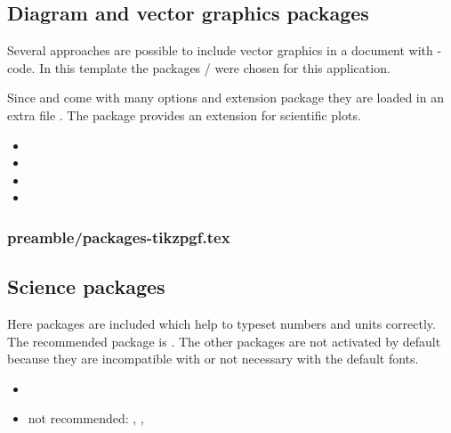 

\subsection{Diagram and vector graphics packages}
Several approaches are possible to include vector graphics in a \latex document with \latex-code. In this template the packages / were chosen for this application.

Since  and  come with many options and 
extension package they are loaded in an extra file 
. The package  
provides an extension for scientific plots.

\begin{itemize}[noitemsep]
\item {}
\item {}
\item {}
\item {}
\end{itemize}


\subsubsection{preamble/packages-tikzpgf.tex}


\subsection{Science packages}
Here packages are included which help to typeset numbers and units correctly.
The recommended package is . The other packages are not activated by default because they are incompatible with  or not necessary with the default fonts.

\begin{itemize}[noitemsep]
\item {}
\item not recommended: , ,  
\end{itemize}

